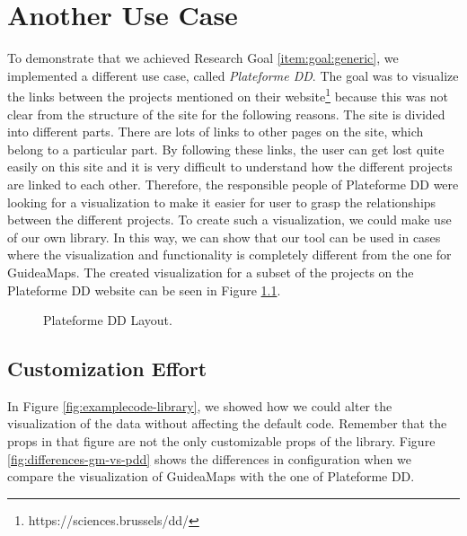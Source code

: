 \chapter{Another Use Case}\label{ch:usecase}
To demonstrate that we achieved Research Goal \ref{item:goal:generic}, we implemented a different use case, called \textit{Plateforme DD}. The goal was to visualize the links between the projects mentioned on their website\footnote{https://sciences.brussels/dd/} because this was not clear from the structure of the site for the following reasons. The site is divided into different parts. There are lots of links to other pages on the site, which belong to a particular part. By following these links, the user can get lost quite easily on this site and it is very difficult to understand how the different projects are linked to each other. Therefore, the responsible people of Plateforme DD were looking for a visualization to make it easier for user to grasp the relationships between the different projects. To create such a visualization, we could make use of our own library. In this way, we can show that our tool can be used in cases where the visualization and functionality is completely different from the one for GuideaMaps. The created visualization for a subset of the projects on the Plateforme DD website can be seen in Figure \ref{fig:plateforme-dd}.\\

\begin{figure}[H]
	\centering
	\caption{Plateforme DD Layout.}
	\label{fig:plateforme-dd}
\end{figure}



\section{Customization Effort}\label{sec:customization-effort}
In Figure \ref{fig:examplecode-library}, we showed how we could alter the visualization of the data without affecting the default code. Remember that the props in that figure are not the only customizable props of the library. Figure \ref{fig:differences-gm-vs-pdd} shows the differences in configuration when we compare the visualization of GuideaMaps with the one of Plateforme DD.


